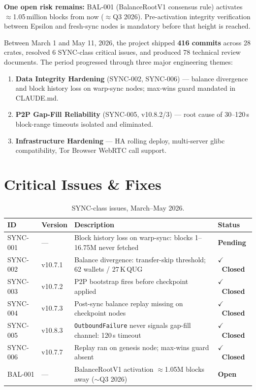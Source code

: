 \documentclass[12pt,a4paper]{article}
\newcommand{\statusopen}{\textcolor{qred}{\bfseries Open}}
\newcommand{\statusclosed}{\textcolor{qgreen}{\bfseries $\checkmark$~Closed}}
\newcommand{\statuspending}{\textcolor{qorange}{\bfseries Pending}}
\begin{document}
\textbf{One open risk remains:} BAL-001 (BalanceRootV1 consensus rule) activates
$\approx$1.05\,million blocks from now ($\approx$Q3 2026). Pre-activation integrity
verification between Epsilon and fresh-sync nodes is mandatory before that height is reached.

Between March 1 and May 11, 2026, the project shipped \textbf{416 commits} across
28 crates, resolved 6 SYNC-class critical issues, and produced 78 technical review
documents. The period progressed through three major engineering themes:

\begin{enumerate}[leftmargin=*,itemsep=2pt]
  \item \textbf{Data Integrity Hardening} (SYNC-002, SYNC-006) — balance divergence
    and block history loss on warp-sync nodes; max-wins guard mandated in CLAUDE.md.
  \item \textbf{P2P Gap-Fill Reliability} (SYNC-005, v10.8.2/3) — root cause of
    30--120\,s block-range timeouts isolated and eliminated.
  \item \textbf{Infrastructure Hardening} — HA rolling deploy, multi-server glibc
    compatibility, Tor Browser WebRTC call support.
\end{enumerate}

\section{Critical Issues \& Fixes}

\begin{table}[H]
\centering
\small
\begin{tabularx}{\linewidth}{llXl}
\toprule
\textbf{ID} & \textbf{Version} & \textbf{Description} & \textbf{Status} \\
\midrule
SYNC-001 & --- & Block history loss on warp-sync: blocks 1--16.75M never fetched &
  \statuspending \\
\rowcolor{rowgray}
SYNC-002 & v10.7.1 & Balance divergence: transfer-skip threshold; 62 wallets / 27\,K\,QUG &
  \statusclosed \\
SYNC-003 & v10.7.2 & P2P bootstrap fires before checkpoint applied &
  \statusclosed \\
\rowcolor{rowgray}
SYNC-004 & v10.7.3 & Post-sync balance replay missing on checkpoint nodes &
  \statusclosed \\
SYNC-005 & v10.8.3 & \texttt{OutboundFailure} never signals gap-fill channel: 120\,s timeout &
  \statusclosed \\
\rowcolor{rowgray}
SYNC-006 & v10.7.7 & Replay ran on genesis node; max-wins guard absent &
  \statusclosed \\
\rowcolor{swotT}
BAL-001 & --- & BalanceRootV1 activation $\approx$1.05M blocks away ($\sim$Q3 2026) &
  \statusopen \\
\bottomrule
\end{tabularx}
\caption{SYNC-class issues, March--May 2026.}
\end{table}
\end{document}
